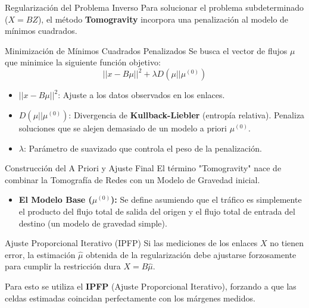 \documentclass[10pt]{beamer}
\begin{document}
    \begin{frame}{Regularización del Problema Inverso}
        \justifying
        Para solucionar el problema subdeterminado ($X = BZ$), el método \textbf{Tomogravity} incorpora una penalización al modelo de mínimos cuadrados. 
        
        \begin{alertblock}{Minimización de Mínimos Cuadrados Penalizados}
            Se busca el vector de flujos $\mu$ que minimice la siguiente función objetivo:
            \begin{equation}
                ||x - B\mu||^2 + \lambda D(\mu || \mu^{(0)})
            \end{equation}
        \end{alertblock}

        \begin{itemize}
            \item $||x - B\mu||^2$: Ajuste a los datos observados en los enlaces.
            \item $D(\mu || \mu^{(0)})$: Divergencia de \textbf{Kullback-Liebler} (entropía relativa). Penaliza soluciones que se alejen demasiado de un modelo a priori $\mu^{(0)}$.
            \item $\lambda$: Parámetro de suavizado que controla el peso de la penalización.
        \end{itemize}
    \end{frame}



    \begin{frame}{Construcción del A Priori y Ajuste Final}
        \justifying
        El término "Tomogravity" nace de combinar la Tomografía de Redes con un Modelo de Gravedad inicial.
        
        \begin{itemize}
            \item \textbf{El Modelo Base ($\mu^{(0)}$):} Se define asumiendo que el tráfico es simplemente el producto del flujo total de salida del origen y el flujo total de entrada del destino (un modelo de gravedad simple).
        \end{itemize}

        \begin{exampleblock}{Ajuste Proporcional Iterativo (IPFP)}
            Si las mediciones de los enlaces $X$ no tienen error, la estimación $\hat{\mu}$ obtenida de la regularización debe ajustarse forzosamente para cumplir la restricción dura $X = B\hat{\mu}$. 
            
            Para esto se utiliza el \textbf{IPFP} (Ajuste Proporcional Iterativo), forzando a que las celdas estimadas coincidan perfectamente con los márgenes medidos.
        \end{exampleblock}
    \end{frame}
\end{document}
